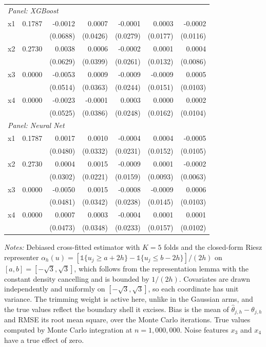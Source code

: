 \documentclass[12pt,a4paper]{article}
\numberwithin{equation}{section}
\theoremstyle{plain}
\theoremstyle{definition}
\begin{document}
\begin{table}[htbp]
\begin{threeparttable}
\begin{tabular}{lrrrrrr}
				\midrule
				\multicolumn{7}{l}{\textit{Panel: XGBoost}} \\
				\quad x1 & 0.1787 & -0.0012 & 0.0007 & -0.0001 & 0.0003 & -0.0002 \\
				&  & (0.0688) & (0.0426) & (0.0279) & (0.0177) & (0.0116) \\
				\quad x2 & 0.2730 & 0.0038 & 0.0006 & -0.0002 & 0.0001 & 0.0004 \\
				&  & (0.0629) & (0.0399) & (0.0261) & (0.0132) & (0.0086) \\
				\quad x3 & 0.0000 & -0.0053 & 0.0009 & -0.0009 & -0.0009 & 0.0005 \\
				&  & (0.0514) & (0.0363) & (0.0244) & (0.0151) & (0.0103) \\
				\quad x4 & 0.0000 & -0.0023 & -0.0001 & 0.0003 & 0.0000 & 0.0002 \\
				&  & (0.0525) & (0.0386) & (0.0248) & (0.0162) & (0.0104) \\
				\midrule
				\multicolumn{7}{l}{\textit{Panel: Neural Net}} \\
				\quad x1 & 0.1787 & 0.0017 & 0.0010 & -0.0004 & 0.0004 & -0.0005 \\
				&  & (0.0480) & (0.0332) & (0.0231) & (0.0152) & (0.0105) \\
				\quad x2 & 0.2730 & 0.0004 & 0.0015 & -0.0009 & 0.0001 & -0.0002 \\
				&  & (0.0302) & (0.0221) & (0.0159) & (0.0093) & (0.0063) \\
				\quad x3 & 0.0000 & -0.0050 & 0.0015 & -0.0008 & -0.0009 & 0.0006 \\
				&  & (0.0481) & (0.0342) & (0.0238) & (0.0145) & (0.0103) \\
				\quad x4 & 0.0000 & 0.0007 & 0.0003 & -0.0004 & 0.0001 & 0.0001 \\
				&  & (0.0473) & (0.0348) & (0.0233) & (0.0157) & (0.0102) \\
				\bottomrule
				\end{tabular}
				\begin{tablenotes}
				\footnotesize
				\item \textit{Notes:} Debiased cross-fitted estimator with $K=5$ folds and the closed-form Riesz representer $\alpha_h(u) = [\mathbb{1}\{u_j \geq a + 2h\} - \mathbb{1}\{u_j \leq b - 2h\}]/(2h)$ on $[a,b] = [-\sqrt{3},\sqrt{3}]$, which follows from the representation lemma with the constant density cancelling and is bounded by $1/(2h)$. Covariates are drawn independently and uniformly on $[-\sqrt{3},\sqrt{3}]$, so each coordinate has unit variance. The trimming weight is active here, unlike in the Gaussian arms, and the true values reflect the boundary shell it excises. Bias is the mean of $\hat{\theta}_{j,h} - \theta_{j,h}$ and RMSE its root mean square, over the Monte Carlo iterations. True values computed by Monte Carlo integration at $n=1{,}000{,}000$. Noise features $x_3$ and $x_4$ have a true effect of zero.
				\end{tablenotes}
		\end{threeparttable}
	\end{table}
	
\end{document}
